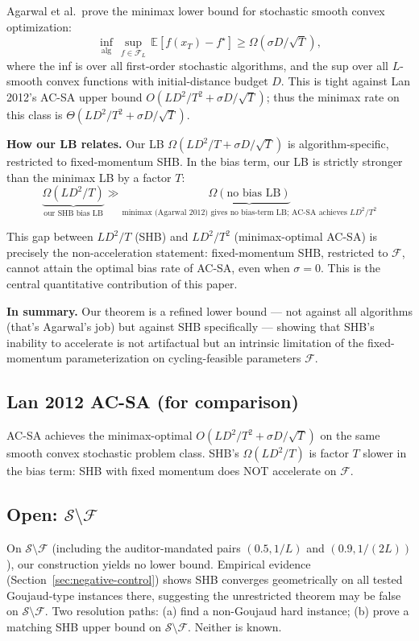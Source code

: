 \documentclass[11pt]{article}
\theoremstyle{definition}
\theoremstyle{remark}
\begin{document}
Agarwal et al.\ prove the minimax lower bound for stochastic smooth convex optimization:
\[
  \inf_{\mathrm{alg}}\,\sup_{f \in \mathcal{F}_{L}}\,\mathbb{E}[f(x_T) - f^\star] \geq \Omega(\sigma D / \sqrt T),
\]
where the inf is over all first-order stochastic algorithms, and the sup over all $L$-smooth convex functions with initial-distance budget $D$. This is tight against Lan 2012's AC-SA upper bound $O(LD^2/T^2 + \sigma D/\sqrt T)$; thus the minimax rate on this class is $\Theta(LD^2/T^2 + \sigma D/\sqrt T)$.

\textbf{How our LB relates.} Our LB $\Omega(LD^2/T + \sigma D/\sqrt T)$ is algorithm-specific, restricted to fixed-momentum SHB. In the bias term, our LB is strictly stronger than the minimax LB by a factor $T$:
\[
  \underbrace{\Omega(LD^2/T)}_{\text{our SHB bias LB}} \gg \underbrace{\Omega(\text{no bias LB})}_{\text{minimax (Agarwal 2012) gives no bias-term LB; AC-SA achieves } LD^2/T^2}
\]

This gap between $LD^2/T$ (SHB) and $LD^2/T^2$ (minimax-optimal AC-SA) is precisely the non-acceleration statement: fixed-momentum SHB, restricted to $\mathcal{F}$, cannot attain the optimal bias rate of AC-SA, even when $\sigma = 0$. This is the central quantitative contribution of this paper.

\textbf{In summary.} Our theorem is a refined lower bound --- not against all algorithms (that's Agarwal's job) but against SHB specifically --- showing that SHB's inability to accelerate is not artifactual but an intrinsic limitation of the fixed-momentum parameterization on cycling-feasible parameters $\mathcal{F}$.

\subsection{Lan 2012 AC-SA (for comparison)}

AC-SA achieves the minimax-optimal $O(LD^2/T^2 + \sigma D/\sqrt T)$ on the same smooth convex stochastic problem class. SHB's $\Omega(LD^2/T)$ is factor $T$ slower in the bias term: SHB with fixed momentum does NOT accelerate on $\mathcal{F}$.

\subsection{Open: \texorpdfstring{$\mathcal{S}\setminus \mathcal{F}$}{S minus F}}

On $\mathcal{S}\setminus\mathcal{F}$ (including the auditor-mandated pairs $(0.5, 1/L)$ and $(0.9, 1/(2L))$), our construction yields no lower bound. Empirical evidence (Section~\ref{sec:negative-control}) shows SHB converges geometrically on all tested Goujaud-type instances there, suggesting the unrestricted theorem may be false on $\mathcal{S}\setminus\mathcal{F}$. Two resolution paths: (a) find a non-Goujaud hard instance; (b) prove a matching SHB upper bound on $\mathcal{S}\setminus\mathcal{F}$. Neither is known.
\end{document}
